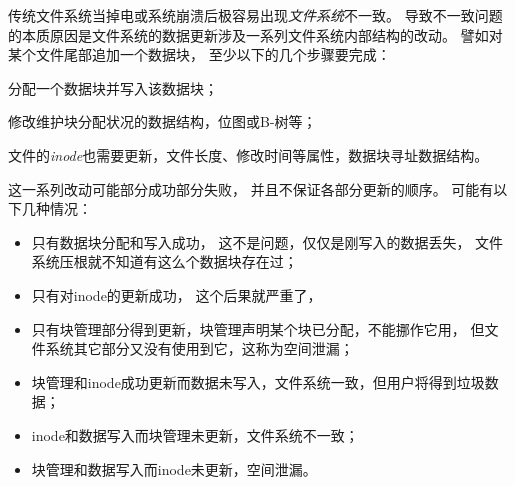 传统文件系统当掉电或系统崩溃后极容易出现\emph{文件系统}不一致。
导致不一致问题的本质原因是文件系统的数据更新涉及一系列文件系统内部结构的改动。
譬如对某个文件尾部追加一个数据块，
至少以下的几个步骤要完成：
\begin{enumerate*}[label=\itshape\alph*\upshape)]
  \item 分配一个数据块并写入该数据块；
  \item 修改维护块分配状况的数据结构，位图或B-树等；
  \item 文件的{\em inode}也需要更新，文件长度、修改时间等属性，数据块寻址数据结构。
\end{enumerate*}
这一系列改动可能部分成功部分失败，
并且不保证各部分更新的顺序。
可能有以下几种情况：
\begin{itemize}
  \item 只有数据块分配和写入成功，
    这不是问题，仅仅是刚写入的数据丢失，
    文件系统压根就不知道有这么个数据块存在过；
  \item 只有对inode的更新成功，
    这个后果就严重了，
  \item 只有块管理部分得到更新，块管理声明某个块已分配，不能挪作它用，
    但文件系统其它部分又没有使用到它，这称为空间泄漏；
  \item 块管理和inode成功更新而数据未写入，文件系统一致，但用户将得到垃圾数据；
  \item inode和数据写入而块管理未更新，文件系统不一致；
  \item 块管理和数据写入而inode未更新，空间泄漏。
\end{itemize}

